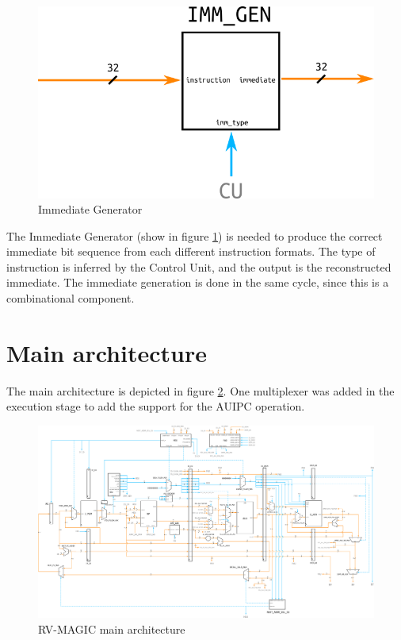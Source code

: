 \documentclass[a4paper]{article}
\begin{document}
\begin{figure}[hbtp]
    \centering
    \includegraphics[]{../immgen/ref/schematic/immgen.png}
    \caption{Immediate Generator}
    \label{fig:immgen}
\end{figure}

The Immediate Generator (show in figure \ref{fig:immgen}) is needed to produce the correct immediate bit sequence from each different instruction formats. The type of instruction is inferred by the Control Unit, and the output is the reconstructed immediate. The immediate generation is done in the same cycle, since this is a combinational component.

\section{Main architecture}
The main architecture is depicted in figure \ref{fig:rv-magic_main}. One multiplexer was added in the execution stage to add the support for the AUIPC operation.

\begin{figure}[hbtp]
	\centering
    \includegraphics[scale=0.2]{../main/ref/schematic/rvMagic.png}
    \caption{RV-MAGIC main architecture}
    \label{fig:rv-magic_main}
\end{figure}
\end{document}
